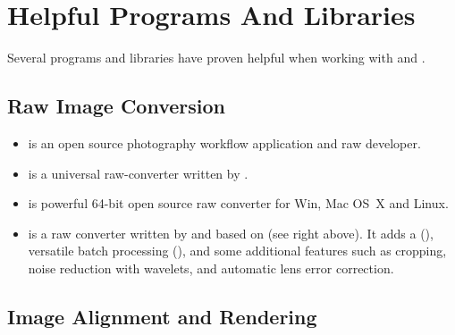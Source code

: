 

\chapter[Helpful Programs\commonpart]{Helpful Programs And Libraries\commonpart
  \label{sec:helpful-programs}
  }

Several programs and libraries have proven helpful when working with
 and .


\section[Raw Image Conversion]{Raw Image Conversion
  \label{sec:raw-image-conversion}
  }

\begin{itemize}
\item
   is
  an open source photography workflow application and raw developer.

\item
   is a
  universal raw-converter written by .

\item
  is powerful 64-bit open source raw converter for Win\asterisk, Mac
  OS~X and Linux.

\item
   is a raw converter
  written by  and based on  (see
  right above).  It adds a 
  (), versatile batch processing
  (), and some additional
  features such as cropping, noise reduction with wavelets, and
  automatic lens error correction.
\end{itemize}


\section[Image Alignment and Rendering]{Image Alignment and Rendering
  \label{sec:image-alignment-and-rendering}
  }


